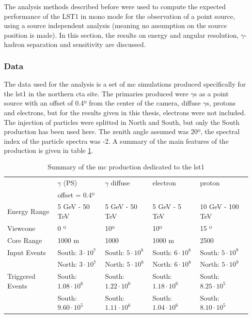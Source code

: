 \documentclass[main.tex]{subfiles}
\begin{document}
The analysis methods described before were used to compute the expected performance of the LST1 in mono mode for the observation of a point source, using a source independent analysis (meaning no assumption on the source position is made). In this section, the results on energy and angular resolution, $\gamma$-hadron separation and sensitivity are discussed.

\subsubsection{Data} \label{sec:mcdata}

The data used for the analysis is a set of \gls{mc} simulations produced specifically for the \gls{lst}1 in the northern \gls{cta} site. The primaries produced were $\gamma$s as a point source with an offset of 0.4º from the center of the camera, diffuse $\gamma$s, protons and electrons, but for the results given in this thesis, electrons were not included. The injection of particles were splitted in North and South, but only the South production has been used here. The zenith angle assumed was 20º, the spectral index of the particle spectra was -2. A summary of the main features of the production is given in table \ref{tab:mcprod}.

\begin{table}
  \centering
    \begin{tabular}{|l|l|l|l|l|}
      \hline
      & $\gamma$ (PS) & $\gamma$ diffuse & electron & proton\\
       & offset = 0.4º & & & \\
      \hline
      Energy Range & 5 GeV - 50 TeV & 5 GeV - 50 TeV & 5 GeV - 5 TeV & 10 GeV - 100 TeV\\
      Viewcone     & 0 º  & 10º & 10º & 15 º \\
      Core Range  & 1000 m & 1000 & 1000 m & 2500 \\
      Input Events & South: $3\cdot 10^7$ & South: $5\cdot 10^8$ & South: $6\cdot 10^8$ & South: $5\cdot 10^9$ \\
      & North: $3\cdot 10^7$ & North: $5\cdot 10^8$ & North: $6\cdot 10^8$ & North: $5\cdot 10^9$ \\
      Triggered Events & South: $1.08\cdot 10^6 $ & South: $1.22\cdot 10^6 $ & South: $1.18\cdot 10^6 $ & South: $8.25\cdot 10^5 $ \\
      & South: $9.60\cdot 10^5 $ & South: $1.11\cdot 10^6 $ & South: $1.04\cdot 10^6 $ & South: $8.10\cdot 10^5 $ \\
      \hline
      \end{tabular}
  \caption{Summary of the \gls{mc} production dedicated to the \gls{lst}1}\label{tab:mcprod}
\end{table}
\end{document}

